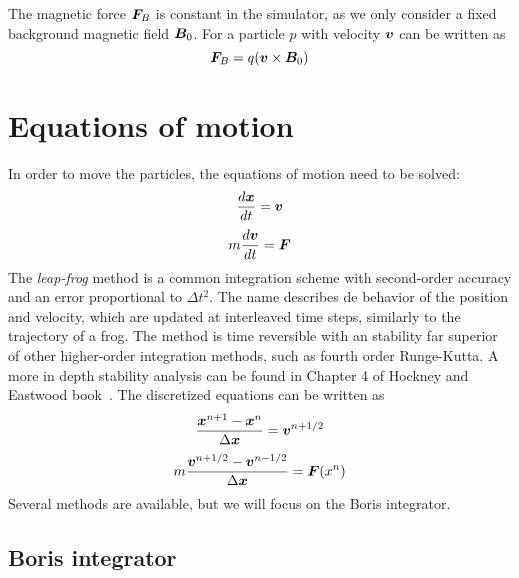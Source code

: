The magnetic force $\bm{F}_B$ is constant in the simulator, as we only consider a 
fixed background magnetic field $\bm{B}_0$. For a particle $p$ with velocity $\bm{v}$  
can be written as
%
\begin{equation}%
\F_B = q (\v \times \B_0)
\end{equation}%


\section{Equations of motion}
\label{sec:motion}

In order to move the particles, the equations of motion need to be solved:
%
\begin{equation}
\frac{d\bm{x}}{dt}=\bm{v}
\end{equation}
\begin{equation}
m \frac{d\bm{v}}{dt} = \bm{F}
\end{equation}
%
The \textit{leap-frog} method is a common integration scheme with second-order 
accuracy and an error proportional to $\Delta t^2$. The name describes de 
behavior of the position and velocity, which are updated at interleaved time 
steps, similarly to the trajectory of a frog. The method is time reversible with 
an stability far superior of other higher-order integration methods, such as 
fourth order Runge-Kutta. A more in depth stability analysis can be found in 
Chapter 4 of Hockney and Eastwood book~\cite{hockney}.  The discretized 
equations can be written as
%
\begin{equation}
\frac{\bm{x}^{n+1} - \bm{x}^{n}}{\Delta \bm{x}} = \bm{v}^{n + 1/2}
\end{equation}
%
\begin{equation}
m\frac{\bm{v}^{n+1/2} - \bm{v}^{n-1/2}}{\Delta \bm{x}} = \bm{F}(x^n)
\end{equation}
%
Several methods are available, but we will focus on the Boris integrator.

\subsection{Boris integrator}
\label{sec:boris}

